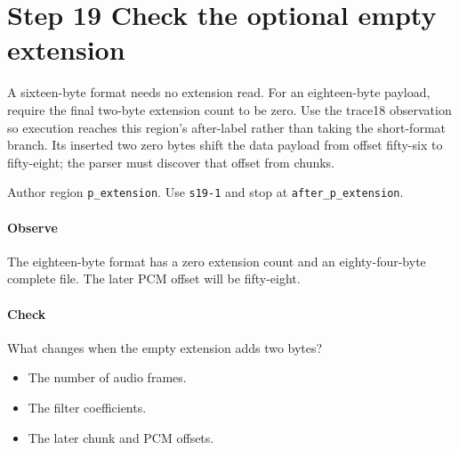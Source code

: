 \section{Step 19 Check the optional empty extension}\label{pcm-wav-s19}
A sixteen-byte format needs no extension read. For an eighteen-byte payload, require the final two-byte extension count to be zero. Use the trace18 observation so execution reaches this region's after-label rather than taking the short-format branch. Its inserted two zero bytes shift the data payload from offset fifty-six to fifty-eight; the parser must discover that offset from chunks.

Author region \texttt{p\_extension}. Use \texttt{s19-1} and stop at \texttt{after\_p\_extension}.

\paragraph{Observe} The eighteen-byte format has a zero extension count and an eighty-four-byte complete file. The later PCM offset will be fifty-eight.

\paragraph{Check} What changes when the empty extension adds two bytes?
\begin{itemize}
  \item[A.] The number of audio frames.
  \item[B.] The filter coefficients.
  \item[C.] The later chunk and PCM offsets.
\end{itemize}
